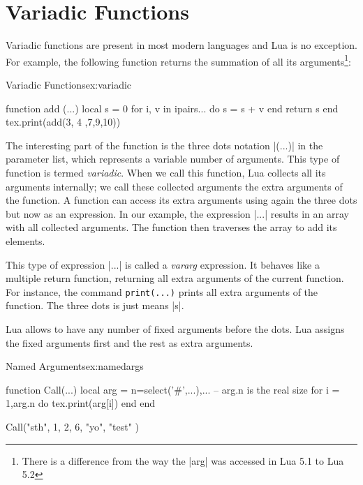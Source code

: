 \chapter{Variadic Functions}

Variadic functions are present in most modern languages and Lua is no exception. For example, the following function returns the summation of all its arguments\footnote{There is a difference from the way the |arg| was accessed in Lua 5.1 to Lua 5.2}:

\begin{texexample}{Variadic Functions}{ex:variadic}
\begin{luacode*}
function add (...)
	local s = 0
	for i, v in ipairs{...} do
   		s = s + v
	end
	return s
end
tex.print(add(3, 4 ,7,9,10))
\end{luacode*}
\end{texexample}

The interesting part of the function is the three dots notation |(...)| in the parameter list, which represents a variable number of arguments. This type of function is termed \emph{variadic}.
When we call this function, Lua collects all its arguments internally; we call
these collected arguments the extra arguments of the function. A function can
access its extra arguments using again the three dots but now as an expression.
In our example, the expression |{...}| results in an array with all collected
arguments. The function then traverses the array to add its elements.

This type of  expression |...| is called  a \emph{vararg} expression. It behaves like a multiple
return function, returning all extra arguments of the current function. For
instance, the command \texttt{print(...)} prints all extra arguments of the function. The three dots is just means |s|.

Lua allows to have any number of fixed arguments before the dots. Lua assigns the fixed arguments first and the rest as extra arguments.

\begin{texexample}{Named Arguments}{ex:namedargs}
\begin{luacode*}
function Call(...)
   local arg = {n=select('#',...),...}
  -- arg.n is the real size
  for i = 1,arg.n do
    tex.print(arg[i])
  end
 end

Call("sth", 1, 2, 6, "yo", "test" )	

\end{luacode*}
\end{texexample}


